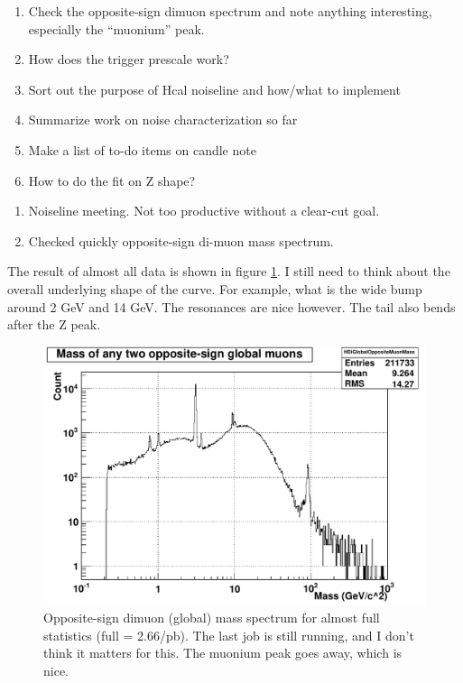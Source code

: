 

\begin{enumerate}
\item Check the opposite-sign dimuon spectrum and note anything interesting, especially the ``muonium'' peak.
\item How does the trigger prescale work?
\item Sort out the purpose of Hcal noiseline and how/what to implement
\item Summarize work on noise characterization so far
\item Make a list of to-do items on candle note
\item How to do the fit on Z shape?
\end{enumerate}


\begin{enumerate}
\item Noiseline meeting.  Not too productive without a clear-cut goal.
\item Checked quickly opposite-sign di-muon mass spectrum.
\end{enumerate}


The result of almost all data is shown in figure \ref{Figure_6265DiGlobalOppositeMuonMass_DataAllExceptLast}.
I still need to think about the overall underlying shape of the curve.  For example, what is the wide bump around 2 GeV and 14 GeV.
The resonances are nice however.  The tail also bends after the Z peak.

\begin{figure}
\includegraphics[width=120mm]{DailyLog/6265/6265DiGlobalOppositeMuonMass_DataAllExceptLast.pdf}
\caption{Opposite-sign dimuon (global) mass spectrum for almost full statistics (full = 2.66/pb).  The last job is
still running, and I don't think it matters for this.  The muonium peak goes away, which is nice.}
\label{Figure_6265DiGlobalOppositeMuonMass_DataAllExceptLast}
\end{figure}

